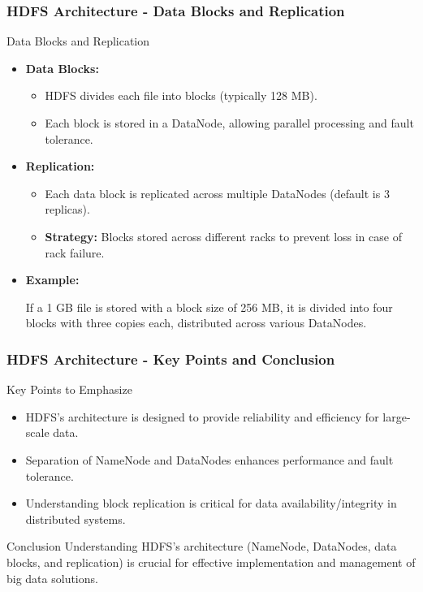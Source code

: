 \documentclass[aspectratio=169]{beamer}
\begin{document}
\begin{frame}[fragile]
    \frametitle{HDFS Architecture - Data Blocks and Replication}
    \begin{block}{Data Blocks and Replication}
        \begin{itemize}
            \item \textbf{Data Blocks:}
                \begin{itemize}
                    \item HDFS divides each file into blocks (typically 128 MB).
                    \item Each block is stored in a DataNode, allowing parallel processing and fault tolerance.
                \end{itemize}
            \item \textbf{Replication:}
                \begin{itemize}
                    \item Each data block is replicated across multiple DataNodes (default is 3 replicas).
                    \item \textbf{Strategy:} Blocks stored across different racks to prevent loss in case of rack failure.
                \end{itemize}
            \item \textbf{Example:}
                \begin{itemize}
                    If a 1 GB file is stored with a block size of 256 MB, it is divided into four blocks with three copies each, distributed across various DataNodes.
                \end{itemize}
        \end{itemize}
    \end{block}
\end{frame}

\begin{frame}[fragile]
    \frametitle{HDFS Architecture - Key Points and Conclusion}
    \begin{block}{Key Points to Emphasize}
        \begin{itemize}
            \item HDFS's architecture is designed to provide reliability and efficiency for large-scale data.
            \item Separation of NameNode and DataNodes enhances performance and fault tolerance.
            \item Understanding block replication is critical for data availability/integrity in distributed systems.
        \end{itemize}
    \end{block}
    
    \begin{block}{Conclusion}
        Understanding HDFS’s architecture (NameNode, DataNodes, data blocks, and replication) is crucial for effective implementation and management of big data solutions.
    \end{block}
\end{frame}
\end{document}
